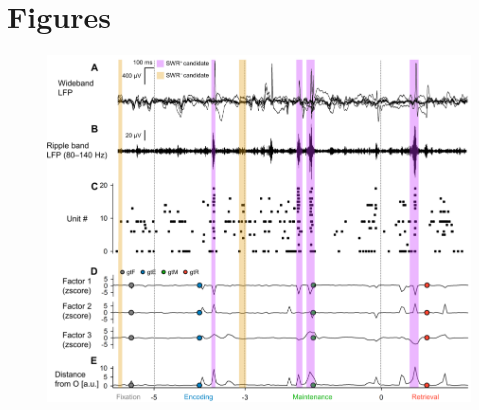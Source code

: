 \documentclass[final,3p,times,twocolumn]{elsarticle}
\providecommand{\DIFaddtex}[1]{{\protect\color{blue}\uwave{#1}}} %
\providecommand{\DIFdeltex}[1]{{\protect\color{red}\sout{#1}}}                      %
\providecommand{\DIFaddFL}[1]{\DIFadd{#1}} %
\providecommand{\DIFdelFL}[1]{\DIFdel{#1}} %
\providecommand{\DIFaddbeginFL}{} %
\providecommand{\DIFdelbeginFL}{} %
\providecommand{\DIFdelendFL}{} %
\providecommand{\DIFadd}[1]{\texorpdfstring{\DIFaddtex{#1}}{#1}} %
\providecommand{\DIFdel}[1]{\texorpdfstring{\DIFdeltex{#1}}{}} %
\newcommand{\DIFscaledelfig}{0.5}
\newlength{\DIFdelgraphicswidth} %
\newlength{\DIFdelgraphicsheight} %
\newcommand{\DIFaddincludegraphics}[2][]{{\color{blue}\fbox{\DIFOincludegraphics[#1]{#2}}}} %
\newcommand{\DIFdelincludegraphics}[2][]{%
\sbox{\DIFdelgraphicsbox}{\DIFOincludegraphics[#1]{#2}}%
\settoboxwidth{\DIFdelgraphicswidth}{\DIFdelgraphicsbox} %
\settoboxtotalheight{\DIFdelgraphicsheight}{\DIFdelgraphicsbox} %
\scalebox{\DIFscaledelfig}{%
\parbox[b]{\DIFdelgraphicswidth}{\usebox{\DIFdelgraphicsbox}\\[-\baselineskip] \rule{\DIFdelgraphicswidth}{0em}}\llap{\resizebox{\DIFdelgraphicswidth}{\DIFdelgraphicsheight}{%
\setlength{\unitlength}{\DIFdelgraphicswidth}%
\begin{picture}(1,1)%
\thicklines\linethickness{2pt} %
{\color[rgb]{1,0,0}\put(0,0){\framebox(1,1){}}}%
{\color[rgb]{1,0,0}\put(0,0){\line( 1,1){1}}}%
{\color[rgb]{1,0,0}\put(0,1){\line(1,-1){1}}}%
\end{picture}%
}\hspace*{3pt}}} %
} %
\DeclareRobustCommand{\DIFaddbeginFL}{\DIFOaddbeginFL \let\includegraphics\DIFaddincludegraphics} %
\DeclareRobustCommand{\DIFdelbeginFL}{\DIFOdelbeginFL \let\includegraphics\DIFdelincludegraphics} %
\DeclareRobustCommand{\DIFdelendFL}{\DIFOaddendFL \let\includegraphics\DIFOincludegraphics} %
\begin{document}
\begin{table}[htbp]
\DIFdelendFL \label{tab:03}
\end{table}
\restoregeometry


\clearpage
\section*{Figures}
\label{figures}
        \clearpage
        \begin{figure}[ht]
        	\centering
            \includegraphics[width=1\textwidth]{./src/figures/.png/Figure_ID_01.png}
        	\caption{\DIFdelbeginFL %
\textbf{%
} %
\textbf{%
}}
\end{figure}
\end{document}

